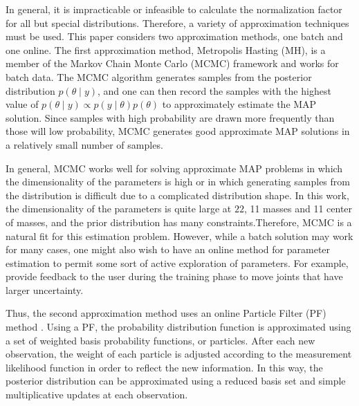 In general, it is impracticable or infeasible to calculate the normalization factor for all but special distributions. Therefore, a variety of approximation techniques must be used.
This paper considers two approximation methods, one batch and one online. The first approximation method, Metropolis Hasting (MH), is a member of the Markov Chain Monte Carlo (MCMC) framework \cite{chib1995understanding} and works for batch data. The MCMC algorithm generates samples from the posterior distribution $p(\theta \mid y)$, and one can then record the samples with the highest value of $p(\theta \mid y) \propto p(y \mid \theta)p(\theta)$ to approximately estimate the MAP solution. Since samples with high probability are drawn more frequently than those will low probability, MCMC generates good approximate MAP solutions in a relatively small number of samples. 

In general, MCMC works well for solving approximate MAP problems in which the dimensionality of the parameters is high or in which generating samples from the distribution is difficult due to a complicated distribution shape. In this work, the dimensionality of the parameters is quite large at $22$, 11 masses and 11 center of masses, and the prior distribution has many constraints.Therefore, MCMC is a natural fit for this estimation problem.
However, while a batch solution may work for many cases, one might also wish to have an online method for parameter estimation to permit some sort of active exploration of parameters. For example, \cite{ayusawa2009optimal,gonzalez2013online} provide feedback to the user during the training phase to move joints that have larger uncertainty.%

Thus, the second approximation method uses an online Particle Filter (PF) method \cite{doucet2009tutorial}. Using a PF, the probability distribution function is approximated using a set of weighted basis probability functions, or particles. After each new observation, the weight of each particle is adjusted according to the measurement likelihood function in order to reflect the new information. In this way, the posterior distribution can be approximated using a reduced basis set and simple multiplicative updates at each observation.

